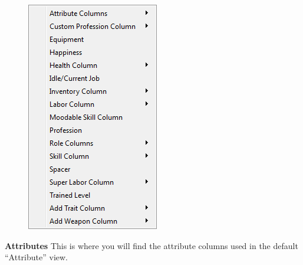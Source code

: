 \documentclass[]{article}
\newcommand{\boldlist}[1] {
\vspace{12pt}
\noindent \textbf{#1}
}
\begin{document}
\begin{figure}
\vspace{-20pt}
  \begin{center}
    \includegraphics[width=\linewidth]{Sec3Fig13+1}
  \end{center}
\vspace{-100pt}
\end{figure}

\boldlist{Attributes} This is where you will find the attribute columns used in the default
``Attribute'' view.
\end{document}
